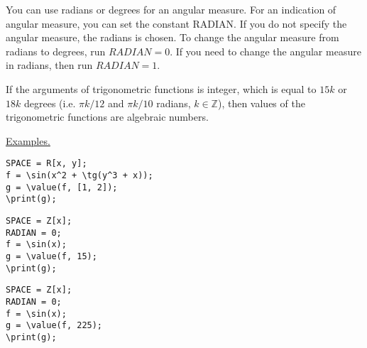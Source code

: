 You can use radians or degrees for an angular measure.
For an indication of angular measure, you can set the constant RADIAN.
If you do not specify the angular measure, the radians is chosen. To change the angular measure from radians to degrees, run $ RADIAN = 0 $. If you need to change the angular measure in radians, then run $ RADIAN = 1 $.

If the arguments of trigonometric functions is integer, which is equal to $ 15k $ or $ 18k $ degrees (i.e.
$\pi k/12 $ and $\pi k/10 $ radians, $k \in \mathbb{Z} $), then values of the trigonometric functions are algebraic numbers.
\smallskip

\underline{Examples. }

\vspace*{-2mm}
\begin{verbatim}
SPACE = R[x, y];
f = \sin(x^2 + \tg(y^3 + x));
g = \value(f, [1, 2]);
\print(g);
\end{verbatim}
\vspace*{-2mm}


\begin{verbatim}
SPACE = Z[x];
RADIAN = 0;
f = \sin(x);
g = \value(f, 15);
\print(g);
\end{verbatim}
\vspace*{-2mm}


\begin{verbatim}
SPACE = Z[x];
RADIAN = 0;
f = \sin(x);
g = \value(f, 225);
\print(g);
\end{verbatim}
\vspace*{-2mm}

